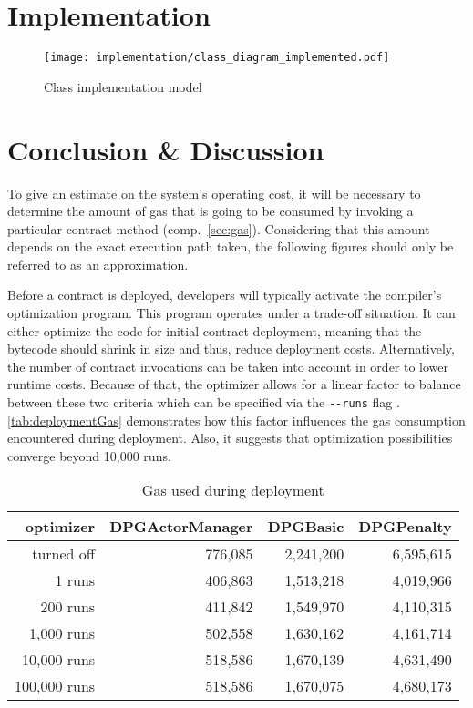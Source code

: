 \begin{appendices}
\FloatBarrier


\chapter{Implementation}
\label{app:implementation}

\pagebreak

\begin{sidewaysfigure}[ht]
    \texttt{[image: implementation/class\_diagram\_implemented.pdf]}
    \caption{Class implementation model}
	\label{fig:classImplementationModel}
\end{sidewaysfigure}

\FloatBarrier

\chapter{Conclusion \& Discussion}
\label{app:conclusion}

To give an estimate on the system's operating cost, it will be necessary to determine the amount of gas that is going to be consumed by invoking a particular contract method (comp.~\ref{sec:gas}). Considering that this amount depends on the exact execution path taken, the following figures should only be referred to as an approximation.

Before a contract is deployed, developers will typically activate the compiler's optimization program. This program operates under a trade-off situation. It can either optimize the code for initial contract deployment, meaning that the bytecode should shrink in size and thus, reduce deployment costs. Alternatively, the number of contract invocations can be taken into account in order to lower runtime costs. Because of that, the optimizer allows for a linear factor to balance between these two criteria which can be specified via the \texttt{-{}-runs} flag \cite[p.~125]{solidityDocs} \cite{compilerOptimization}. \autoref{tab:deploymentGas} demonstrates how this factor influences the gas consumption encountered during deployment. Also, it suggests that optimization possibilities converge beyond 10,000 runs.

\begin{table}[hbt]
	\centering	
	\begin{tabular}{r|r|r|r}
    	optimizer & DPGActorManager & DPGBasic & DPGPenalty \\
    	\hline
    	turned off & 776,085 & 2,241,200 & 6,595,615 \\
    	1 runs & 406,863 & 1,513,218 & 4,019,966 \\ 
    	200 runs & 411,842 & 1,549,970 & 4,110,315 \\
    	1,000 runs & 502,558 & 1,630,162 & 4,161,714 \\ 
    	10,000 runs & 518,586 & 1,670,139 & 4,631,490 \\
    	100,000 runs & 518,586 & 1,670,075 & 4,680,173 \\
	\end{tabular}
	\caption{Gas used during deployment}
	\label{tab:deploymentGas}
\end{table}


\end{appendices}
